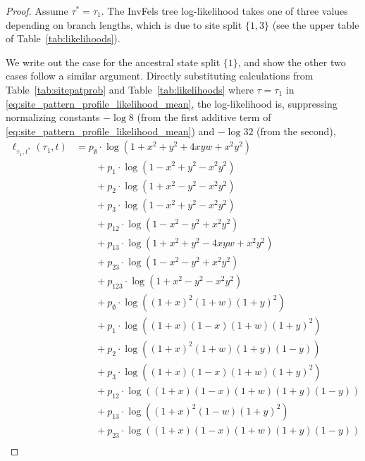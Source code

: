 \begin{proof}
Assume $\tau^*=\tau_1$.
The InvFels tree log-likelihood takes one of three values depending on branch lengths, which is due to site split $\{1,3\}$ (see the upper table of Table~\ref{tab:likelihoods}).

We write out the case for the ancestral state split $\{1\}$, and show the other two cases follow a similar argument.
Directly substituting calculations from Table~\ref{tab:sitepatprob} and Table~\ref{tab:likelihoods} where $\tau = \tau_1$ in \eqref{eq:site_pattern_profile_likelihood_mean}, the log-likelihood is, suppressing normalizing constants $-\log 8$ (from the first additive term of \eqref{eq:site_pattern_profile_likelihood_mean}) and $-\log 32$ (from the second),
\begin{align}
    \label{eq:farris_likelihood}
    \ell_{\tau_1,t^*}(\tau_1, t)
    &=        p_{\emptyset}  \cdot\log(1+x^2+y^2+4xyw+x^2y^2) \nonumber \\
    &\qquad + p_{1}          \cdot\log(1-x^2+y^2-x^2y^2) \nonumber \\
    &\qquad + p_{2}          \cdot\log(1+x^2-y^2-x^2y^2) \nonumber \\
    &\qquad + p_{3}          \cdot\log(1-x^2+y^2-x^2y^2) \nonumber \\
    &\qquad + p_{12}         \cdot\log(1-x^2-y^2+x^2y^2) \nonumber \\
    &\qquad + p_{13}         \cdot\log(1+x^2+y^2-4xyw+x^2y^2) \nonumber \\
    &\qquad + p_{23}         \cdot\log(1-x^2-y^2+x^2y^2) \nonumber \\
    &\qquad + p_{123}        \cdot\log(1+x^2-y^2-x^2y^2) \nonumber \\
    &\qquad + p_{\emptyset}  \cdot\log((1+x)^2   (1+w)(1+y)^2) \nonumber \\
    &\qquad + p_{1}          \cdot\log((1+x)(1-x)(1+w)(1+y)^2) \nonumber \\
    &\qquad + p_{2}          \cdot\log((1+x)^2   (1+w)(1+y)(1-y)) \nonumber \\
    &\qquad + p_{3}          \cdot\log((1+x)(1-x)(1+w)(1+y)^2) \nonumber \\
    &\qquad + p_{12}         \cdot\log((1+x)(1-x)(1+w)(1+y)(1-y)) \nonumber \\
    &\qquad + p_{13}         \cdot\log((1+x)^2   (1-w)(1+y)^2) \nonumber \\
    &\qquad + p_{23}         \cdot\log((1+x)(1-x)(1+w)(1+y)(1-y)) \nonumber \\

\end{align}
\end{proof}
